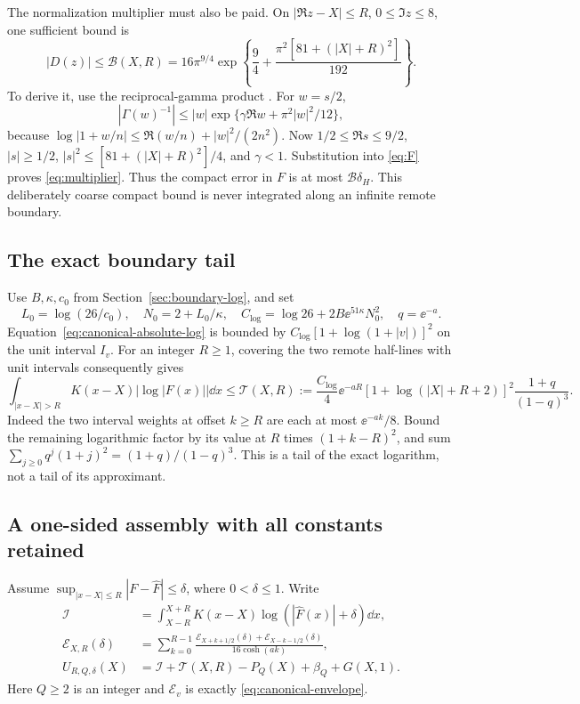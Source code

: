 The normalization multiplier must also be paid. On
\(|\Re z-X|\le R\), \(0\le\Im z\le8\), one sufficient bound is
\begin{equation}\label{eq:multiplier}
 |D(z)|\le\mathcal B(X,R)
 =16\pi^{9/4}\exp\left\{\frac94+
                 \frac{\pi^2[81+(|X|+R)^2]}{192}\right\}.
\end{equation}
To derive it, use the reciprocal-gamma product
\cite[5.8.2]{DLMFReciprocalGammaOC}. For \(w=s/2\),
\[
 |\Gamma(w)^{-1}|
 \le|w|\exp\{\gamma\Re w+\pi^2|w|^2/12\},
\]
because \(\log|1+w/n|\le\Re(w/n)+|w|^2/(2n^2)\).
Now \(1/2\le\Re s\le9/2\), \(|s|\ge1/2\),
\(|s|^2\le[81+(|X|+R)^2]/4\), and \(\gamma<1\).
Substitution into \eqref{eq:F} proves \eqref{eq:multiplier}.
Thus the compact error in \(F\) is at most \(\mathcal B\delta_H\).
This deliberately coarse compact bound is never integrated along an
infinite remote boundary.

\subsection{The exact boundary tail}
Use \(B,\kappa,c_0\) from Section~\ref{sec:boundary-log}, and set
\[
 L_0=\log(26/c_0),\quad N_0=2+L_0/\kappa,\quad
 C_{\log}=\log26+2B\ee^{51\kappa}N_0^2,\quad q=\ee^{-a}.
\]
Equation~\eqref{eq:canonical-absolute-log} is bounded by
\(C_{\log}[1+\log(1+|v|)]^2\) on the unit interval \(I_v\).
For an integer \(R\ge1\), covering the two remote half-lines with
unit intervals consequently gives
\begin{equation}\label{eq:assembled-log-tail}
 \int_{|x-X|>R}K(x-X)|\log|F(x)||\dd x
 \le\mathcal T(X,R):=\frac{C_{\log}}4\ee^{-aR}
 [1+\log(|X|+R+2)]^2\frac{1+q}{(1-q)^3}.
\end{equation}
Indeed the two interval weights at offset \(k\ge R\) are each at
most \(\ee^{-ak}/8\). Bound the remaining logarithmic factor by its
value at \(R\) times \((1+k-R)^2\), and sum
\(\sum_{j\ge0}q^j(1+j)^2=(1+q)/(1-q)^3\).
This is a tail of the exact logarithm, not a tail of its approximant.

\subsection{A one-sided assembly with all constants retained}
Assume \(\sup_{|x-X|\le R}|F-\widehat F|\le\delta\),
where \(0<\delta\le1\). Write
\begin{align}
 \mathcal I&=\int_{X-R}^{X+R}K(x-X)
                    \log(|\widehat F(x)|+\delta)\dd x,\nonumber\\
 \mathcal E_{X,R}(\delta)&=\sum_{k=0}^{R-1}
 \frac{\mathcal E_{X+k+1/2}(\delta)+\mathcal E_{X-k-1/2}(\delta)}
 {16\cosh(ak)},\label{eq:compact-log-envelope}\\
 U_{R,Q,\delta}(X)&=\mathcal I+\mathcal T(X,R)-P_Q(X)+\beta_Q+G(X,1).
 \label{eq:signed-upper}
\end{align}
Here \(Q\ge2\) is an integer and \(\mathcal E_v\) is exactly
\eqref{eq:canonical-envelope}.

